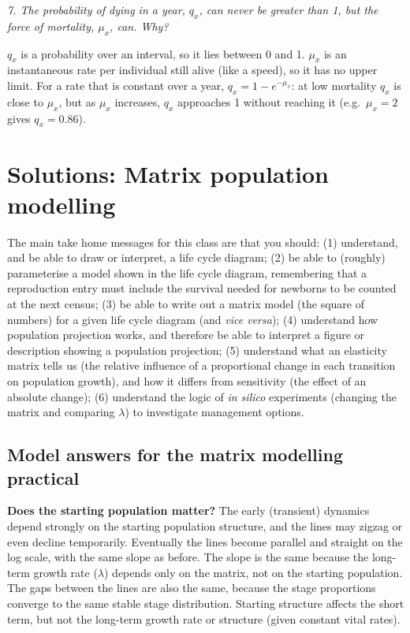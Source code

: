 \documentclass[
  a4paper]{book}
\begin{document}
\emph{7. The probability of dying in a year, \(q_x\), can never be greater than 1, but the force of mortality, \(\mu_x\), can. Why?}

\(q_x\) is a probability over an interval, so it lies between 0 and 1. \(\mu_x\) is an instantaneous rate per individual still alive (like a speed), so it has no upper limit. For a rate that is constant over a year, \(q_x = 1 - e^{-\mu_x}\): at low mortality \(q_x\) is close to \(\mu_x\), but as \(\mu_x\) increases, \(q_x\) approaches 1 without reaching it (e.g.~\(\mu_x = 2\) gives \(q_x = 0.86\)).

\section{Solutions: Matrix population modelling}\label{solutions-matrix-population-modelling}

The main take home messages for this class are that you should:
(1) understand, and be able to draw or interpret, a life cycle diagram;
(2) be able to (roughly) parameterise a model shown in the life cycle diagram, remembering that a reproduction entry must include the survival needed for newborns to be counted at the next census;
(3) be able to write out a matrix model (the square of numbers) for a given life cycle diagram (and \emph{vice versa});
(4) understand how population projection works, and therefore be able to interpret a figure or description showing a population projection;
(5) understand what an elasticity matrix tells us (the relative influence of a proportional change in each transition on population growth), and how it differs from sensitivity (the effect of an absolute change);
(6) understand the logic of \emph{in silico} experiments (changing the matrix and comparing \(\lambda\)) to investigate management options.

\subsection{Model answers for the matrix modelling practical}\label{model-answers-for-the-matrix-modelling-practical}

\textbf{Does the starting population matter?} The early (transient) dynamics depend strongly on the starting population structure, and the lines may zigzag or even decline temporarily. Eventually the lines become parallel and straight on the log scale, with the same slope as before. The slope is the same because the long-term growth rate (\(\lambda\)) depends only on the matrix, not on the starting population. The gaps between the lines are also the same, because the stage proportions converge to the same stable stage distribution. Starting structure affects the short term, but not the long-term growth rate or structure (given constant vital rates).
\end{document}
